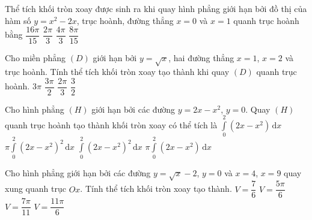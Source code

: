 \begin{ex}%
	Thể tích khối tròn xoay được sinh ra khi quay hình phẳng giới hạn bởi đồ thị của hàm số $y=x^2-2x$, trục hoành, đường thẳng $x=0$ và $x=1$ quanh trục hoành bằng
	\choice
	{$\dfrac{16\pi}{15}$}
	{$\dfrac{2\pi}{3}$}
	{$\dfrac{4\pi}{3}$}
	{\True $\dfrac{8\pi}{15}$}
\end{ex}

\begin{ex}%
	Cho miền phẳng $(D)$ giới hạn bởi $y=\sqrt x$, hai đường thẳng $x=1$, $x=2$ và trục hoành. Tính thể tích khối tròn xoay tạo thành khi quay $(D)$ quanh trục hoành.
	\choice
	{$3\pi $}
	{\True $\dfrac{3\pi}{2}$}
	{$\dfrac{2\pi}{3}$}
	{$\dfrac{3}{2}$}
\end{ex}

\begin{ex}%
	Cho hình phẳng $(H)$ giới hạn bởi các đường $y=2x-x^2$, $y=0$. Quay $(H)$ quanh trục hoành tạo thành khối tròn xoay có thể tích là
	\choice
	{$\displaystyle\int\limits_0^2\left(2x-x^2\right)\mathrm{\,d}x$}
	{\True $\pi\displaystyle\int\limits_0^2\left(2x-x^2\right)^2\mathrm{\,d}x$}
	{$\displaystyle\int\limits_0^2\left(2x-x^2\right)^2\mathrm{\,d}x$}
	{$\pi\displaystyle\int\limits_0^2\left(2x-x^2\right)\mathrm{\,d}x$}
\end{ex}

\begin{ex}%
	Cho hình phẳng giới hạn bởi các đường $y=\sqrt{x}-2$, $y=0$ và $x=4$, $x=9$ quay xung quanh trục $Ox$. Tính thể tích khối tròn xoay tạo thành.
	\choice
	{$V=\dfrac{7}{6}$}
	{$V=\dfrac{5\pi}{6}$}
	{$V=\dfrac{7\pi}{11}$}
	{\True $V=\dfrac{11\pi}{6}$}
\end{ex}

